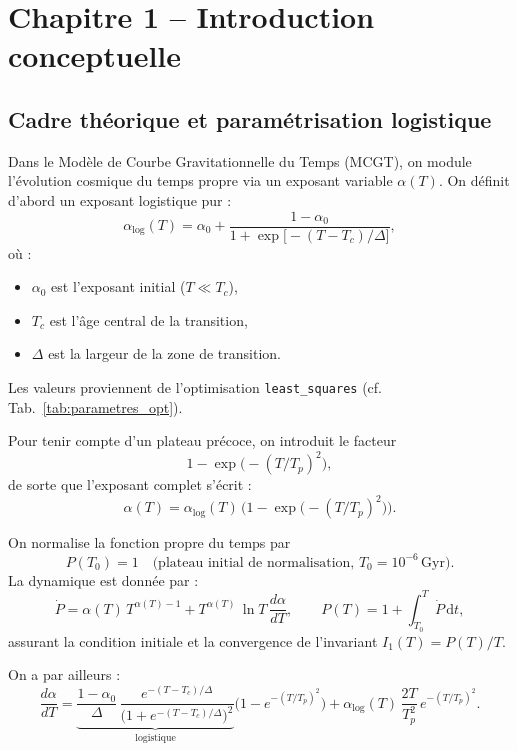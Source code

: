 \section{Chapitre 1 – Introduction conceptuelle}

\subsection{Cadre théorique et paramétrisation logistique}

Dans le Modèle de Courbe Gravitationnelle du Temps (MCGT), on module l’évolution cosmique du temps propre via un exposant variable \(\alpha(T)\). On définit d’abord un exposant logistique pur :
\[
  \alpha_{\mathrm{log}}(T)
  = \alpha_{0}
    + \frac{1 - \alpha_{0}}{1 + \exp\!\bigl[-(T - T_{c})/\Delta\bigr]},
\]
où :
\begin{itemize}
  \item \(\alpha_{0}\) est l’exposant initial (\(T\ll T_{c}\)),
  \item \(T_{c}\) est l’âge central de la transition,
  \item \(\Delta\) est la largeur de la zone de transition.
\end{itemize}

\begin{center}
\end{center}
Les valeurs proviennent de l’optimisation \texttt{least\_squares} (cf. Tab.~\ref{tab:parametres_opt}).

Pour tenir compte d’un plateau précoce, on introduit le facteur
\[
  1 - \exp\!\bigl(-(T/T_{p})^{2}\bigr),
\]
de sorte que l’exposant complet s’écrit :
\[
  \alpha(T)
  = \alpha_{\mathrm{log}}(T)\,\bigl(1 - \exp\!\bigl(-(T/T_{p})^{2}\bigr)\bigr).
\]

On normalise la fonction propre du temps par
\[
  P(T_{0}) = 1
  \quad\bigl(\text{plateau initial de normalisation, }T_{0}=10^{-6}\,\mathrm{Gyr}\bigr).
\]
La dynamique est donnée par :
\[
  \dot P
    = \alpha(T)\,T^{\alpha(T)-1}
    + T^{\alpha(T)}\,\ln T\,\frac{d\alpha}{dT},
\qquad
  P(T)
    = 1 + \int_{T_{0}}^{T}\dot P\,\mathrm{d}t,
\]
assurant la condition initiale et la convergence de l’invariant \(I_{1}(T)=P(T)/T\).

On a par ailleurs :
\[
  \frac{d\alpha}{dT}
  = \underbrace{\frac{1-\alpha_{0}}{\Delta}\,
    \frac{e^{-(T-T_{c})/\Delta}}{\bigl(1+e^{-(T-T_{c})/\Delta}\bigr)^{2}}
  }_{\text{logistique}}
  \bigl(1-e^{-(T/T_{p})^{2}}\bigr)
  + \alpha_{\mathrm{log}}(T)\,\frac{2T}{T_{p}^{2}}\,e^{-(T/T_{p})^{2}}.
\]

